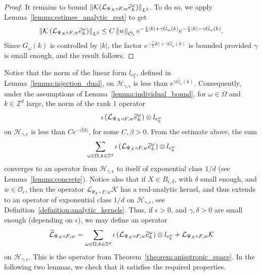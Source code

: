 \documentclass[AHL,Unicode,longabstracts,published]{cedram}
\newcommand{\n}[1]{\left\|#1\right\|}
\newcommand{\va}[1]{\left|#1\right|}
\newcommand{\clO}{\mathcal{O}}
\newcommand{\clL}{\mathcal{L}}
\newcommand{\clH}{\mathcal{H}}
\newcommand{\clK}{\mathcal{K}}
\newcommand{\bbZ}{\mathbb{Z}}
\let\oldtilde\tilde
\renewcommand*{\tilde}[1]{\mathchoice{\widetilde{#1}}{\widetilde{#1}}{\oldtilde{#1}}{\oldtilde{#1}}}
\newcommand{\clO}{\mathcal{O}}
\begin{document}
\begin{proof}
It remains to bound $\n{\clK (\clL_{\Psi_X \circ F,w} \tilde{e}_{k}^\omega)}_{L^2}$. To do so, we apply Lemma~\ref{lemma:estimee_analytic_rest} to get
\begin{equation*}
\n{\clK \left(\clL_{\Psi_X \circ F,w} \tilde{e}_{k}^\omega\right)}_{L^2} \leq C \n{w}_{\clO_\epsilon} e^{ - \frac{\tau}{2} |k| + \gamma G_\omega(k)} e^{- \frac{\tau}{2} |k| - \gamma G_\omega(k)}.
\end{equation*}
Since $G_\omega(k)$ is controlled by $|k|$, the factor $e^{ - \frac{\tau}{2} |k| + \gamma G_\omega(k)}$ is bounded provided $\gamma$ is small enough, and the result follows.
\end{proof}

Notice that the norm of the linear form $l_{e_k^\omega}$, defined in Lemma~\ref{lemma:injection_dual}, on $\clH_{\gamma,\epsilon}$ is less than $e^{\gamma G_\omega(k)}$. Consequently, under the assumptions of Lemma~\ref{lemma:individual_bound}, for $\omega\in \Omega$ and $k \in \bbZ^d$ large, the norm of the rank $1$ operator
\begin{equation*}
\iota\left(\clL_{\Psi_X \circ F,w} \tilde{e}_{k}^\omega\right) \otimes l_{e_k^\omega}
\end{equation*}
on $\clH_{\gamma,\epsilon}$ is less than $Ce^{- \beta \va{k}}$, for some $C,\beta > 0$. From the estimate above, the sum
\begin{equation*}
\sum_{\omega \in \Omega, k \in \bbZ^d} \iota\left(\clL_{\Psi_X \circ F,w} \tilde{e}_{k}^\omega\right) \otimes l_{e_k^\omega}
\end{equation*}
converges to an operator from $\clH_{\gamma,\epsilon}$ to itself of exponential class $1/d$ (see Lemma~\ref{lemma:concrete}). Notice also that if $X \in B_{\epsilon,\delta}$, with $\delta$ small enough, and $w \in \clO_\epsilon$, then the operator $\clL_{\Psi_X \circ F,w} \clK $ has a real-analytic kernel, and thus extends to an operator of exponential class $1/d$ on $\clH_{\gamma,\epsilon}$, see Definition~\ref{definition:analytic_kernels}. Thus, if $\epsilon > 0$, and $\gamma, \delta > 0$ are small enough (depending on $\epsilon$), we may define an operator
\begin{equation}\label{eq:def_L_tilde}
\widetilde{\clL}_{\Psi_X \circ F,w} = \sum_{\omega \in \Omega, k \in \bbZ^d} \iota\left(\clL_{\Psi_X \circ F,w} \tilde{e}_{k}^\omega\right) \otimes l_{e_k^\omega} + \clL_{\Psi_X \circ F,w} \clK 
\end{equation}
on $\clH_{\gamma,\epsilon}$. This is the operator from Theorem~\ref{theorem:anisotropic_space}. In the following two lemmas, we check that it satisfies the required properties.
\end{document}
